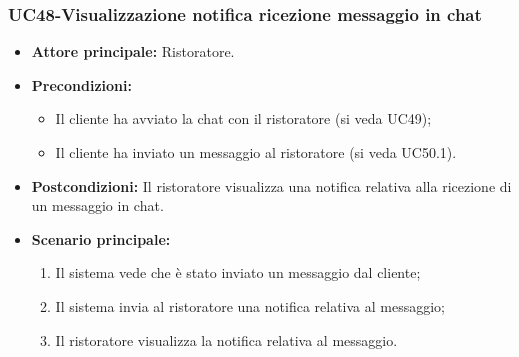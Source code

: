 \subsubsection{UC48-Visualizzazione notifica ricezione messaggio in chat}
\begin{itemize}
\item \textbf{Attore principale:} Ristoratore.
\item \textbf{Precondizioni:}
\begin{itemize}
    \item Il cliente ha avviato la chat con il ristoratore (si veda UC49);
    \item Il cliente ha inviato un messaggio al ristoratore (si veda UC50.1).
\end{itemize}
\item \textbf{Postcondizioni:} Il ristoratore visualizza una notifica relativa alla ricezione di un messaggio in chat.
\item \textbf{Scenario principale:}
\begin{enumerate}
    \item Il sistema vede che è stato inviato un messaggio dal cliente;
    \item Il sistema invia al ristoratore una notifica relativa al messaggio;
    \item Il ristoratore visualizza la notifica relativa al messaggio.
\end{enumerate}
\end{itemize}


